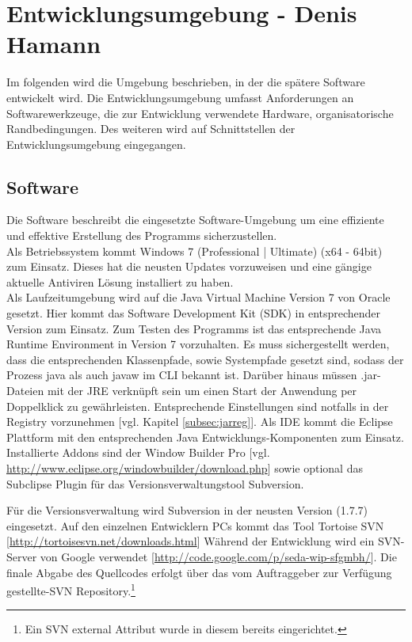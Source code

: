\section{Entwicklungsumgebung - Denis Hamann}
\label{sec:Entwicklungsumgebung}

Im folgenden wird die Umgebung beschrieben, in der die spätere Software entwickelt wird.
Die Entwicklungsumgebung umfasst Anforderungen an Softwarewerkzeuge, die zur Entwicklung verwendete Hardware, organisatorische
Randbedingungen. Des weiteren wird auf Schnittstellen der Entwicklungsumgebung eingegangen.

\subsection{Software}
\label{subsec:devsoftware}

Die Software beschreibt die eingesetzte Software-Umgebung um eine effiziente und effektive Erstellung des Programms sicherzustellen.\\

Als Betriebssystem kommt Windows 7 (Professional | Ultimate) (x64 - 64bit) zum Einsatz. Dieses hat die neusten Updates vorzuweisen und eine gängige aktuelle Antiviren Lösung installiert zu haben.\\

Als Laufzeitumgebung wird auf die Java Virtual Machine Version 7 von Oracle gesetzt. Hier kommt das Software Development Kit (SDK) in entsprechender Version zum Einsatz.
Zum Testen des Programms ist das entsprechende Java Runtime Environment in Version 7 vorzuhalten. Es muss sichergestellt werden, dass die entsprechenden Klassenpfade, sowie Systempfade gesetzt sind, sodass der Prozess java als auch javaw im CLI bekannt ist. Darüber hinaus müssen .jar-Dateien mit der JRE verknüpft sein um einen Start der Anwendung per Doppelklick zu gewährleisten. Entsprechende Einstellungen sind notfalls in der Registry vorzunehmen [vgl. Kapitel \ref{subsec:jarreg}].
Als IDE kommt die Eclipse Plattform mit den entsprechenden Java Entwicklungs-Komponenten zum Einsatz. Installierte Addons sind der Window Builder Pro [vgl. \url{http://www.eclipse.org/windowbuilder/download.php}] sowie optional das Subclipse Plugin für das Versionsverwaltungstool Subversion.

Für die Versionsverwaltung wird Subversion in der neusten Version (1.7.7) eingesetzt. Auf den einzelnen Entwicklern PCs kommt das Tool Tortoise SVN [\url{http://tortoisesvn.net/downloads.html}]
Während der Entwicklung wird ein SVN-Server von Google verwendet [\url{http://code.google.com/p/seda-wip-sfgmbh/}]. Die finale Abgabe des Quellcodes erfolgt über das vom Auftraggeber zur Verfügung gestellte-SVN Repository.\footnote{Ein SVN external Attribut wurde in diesem bereits eingerichtet.}\\

